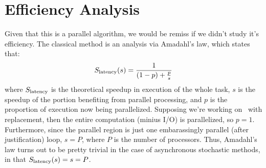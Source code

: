 \section{Efficiency Analysis}

Given that this is a parallel algorithm, we would be remiss if we didn't study
it's efficiency. The classical method is an analysis via Amadahl's law, which
states that:
\[
  S_{{\rm latency}}(s) = \frac{1}{(1-p) + \frac{p}{s}}
\]
where $S_{{\rm latency}}$ is the theoretical speedup in execution of the whole
task, $s$ is the speedup of the portion benefiting from parallel processing, and
$p$ is the proportion of execution now being parallelized. Supposing we're
working on \hogwild\ with replacement, then the entire computation (minius I/O)
is parallelized, so $p = 1$. Furthermore, since the parallel region is just one
embarassingly parallel (after justification) loop, $s = P$, where $P$ is the
number of processors. Thus, Amadahl's law turns out to be pretty trivial in the
case of asynchronous stochastic methods, in that $S_{{\rm latency}}(s) = s = P$.

